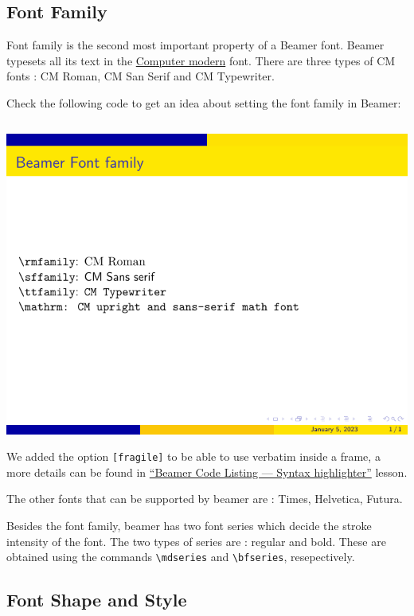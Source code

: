 \subsection{Font Family}

Font family is the second most important property of a Beamer font. Beamer typesets all its text in the \href{https://en.wikipedia.org/wiki/Computer_Modern}{Computer modern} font. There are three types of CM fonts : CM Roman, CM San Serif and CM Typewriter.

Check the following code to get an idea about setting the font family in Beamer:

\inputminted[linenos=true]{latex}{examples/beamer/font-family.tex}

\includegraphics{examples/beamer/font-family.pdf}

We added the option \verb|[fragile]| to be able to use verbatim inside a frame, a more details can be found in \href{https://latex-beamer.com/tutorials/beamer-code/}{“Beamer Code Listing — Syntax highlighter”} lesson.

The other fonts that can be supported by beamer are : Times, Helvetica, Futura.

Besides the font family, beamer has two font series which decide the stroke intensity of the font. The two types of series are : regular and bold. These are obtained using the commands \verb|\mdseries| and \verb|\bfseries|, resepectively.

\subsection{Font Shape and Style}


